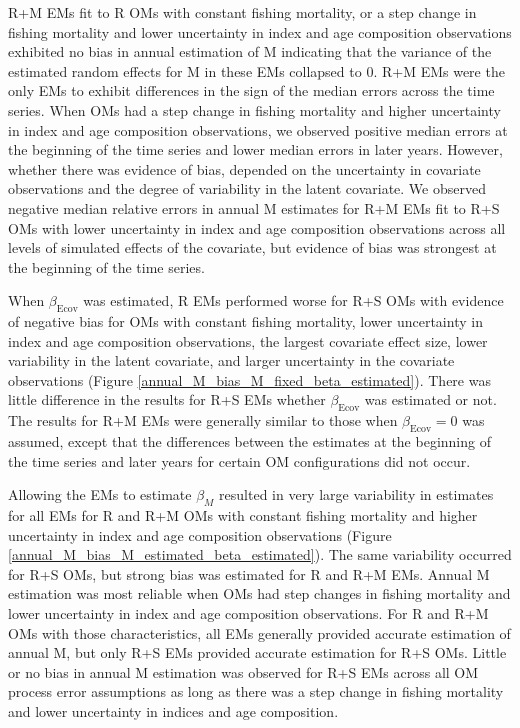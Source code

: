 \documentclass[
  12pt,
]{article}
\begin{document}
R+M EMs fit to R OMs with constant fishing mortality, or a step change
in fishing mortality and lower uncertainty in index and age composition
observations exhibited no bias in annual estimation of M indicating that
the variance of the estimated random effects for M in these EMs
collapsed to 0. R+M EMs were the only EMs to exhibit differences in the
sign of the median errors across the time series. When OMs had a step
change in fishing mortality and higher uncertainty in index and age
composition observations, we observed positive median errors at the
beginning of the time series and lower median errors in later years.
However, whether there was evidence of bias, depended on the uncertainty
in covariate observations and the degree of variability in the latent
covariate. We observed negative median relative errors in annual M
estimates for R+M EMs fit to R+S OMs with lower uncertainty in index and
age composition observations across all levels of simulated effects of
the covariate, but evidence of bias was strongest at the beginning of
the time series.

When \(\beta_\text{Ecov}\) was estimated, R EMs performed worse for R+S
OMs with evidence of negative bias for OMs with constant fishing
mortality, lower uncertainty in index and age composition observations,
the largest covariate effect size, lower variability in the latent
covariate, and larger uncertainty in the covariate observations (Figure
\ref{annual_M_bias_M_fixed_beta_estimated}). There was little difference
in the results for R+S EMs whether \(\beta_\text{Ecov}\) was estimated
or not. The results for R+M EMs were generally similar to those when
\(\beta_\text{Ecov}=0\) was assumed, except that the differences between
the estimates at the beginning of the time series and later years for
certain OM configurations did not occur.

Allowing the EMs to estimate \(\beta_M\) resulted in very large
variability in estimates for all EMs for R and R+M OMs with constant
fishing mortality and higher uncertainty in index and age composition
observations (Figure \ref{annual_M_bias_M_estimated_beta_estimated}).
The same variability occurred for R+S OMs, but strong bias was estimated
for R and R+M EMs. Annual M estimation was most reliable when OMs had
step changes in fishing mortality and lower uncertainty in index and age
composition observations. For R and R+M OMs with those characteristics,
all EMs generally provided accurate estimation of annual M, but only R+S
EMs provided accurate estimation for R+S OMs. Little or no bias in
annual M estimation was observed for R+S EMs across all OM process error
assumptions as long as there was a step change in fishing mortality and
lower uncertainty in indices and age composition.
\end{document}
